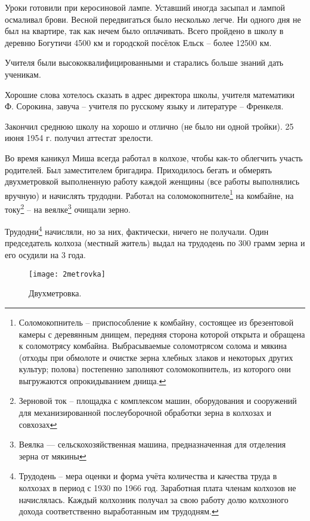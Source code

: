Уроки готовили при керосиновой лампе. Уставший иногда засыпал и лампой осмаливал брови. Весной передвигаться было несколько легче. Ни одного дня не был на квартире, так как нечем было оплачивать. Всего пройдено в школу в деревню Богутичи 4500 км и городской посёлок Ельск \--- более 12500 км. 

Учителя были высококвалифицированными и старались больше знаний дать ученикам.

Хорошие слова хотелось сказать в адрес директора школы, учителя математики Ф. Сорокина, завуча \--- учителя по русскому языку и литературе \--- Френкеля. 

Закончил среднюю школу на хорошо и отлично (не было ни одной тройки). 25 июня 1954 г. получил аттестат зрелости.

Во время каникул Миша всегда работал в колхозе, чтобы как-то облегчить участь родителей. Был заместителем бригадира. Приходилось бегать и обмерять двухметровкой выполненную работу каждой женщины (все работы выполнялись вручную) и начислять трудодни. Работал на соломокопнителе\footnote{Соломокопнитель \--- приспособление к комбайну, состоящее из брезентовой камеры с деревянным днищем, передняя сторона которой открыта и обращена к соломотрясу комбайна. Выбрасываемые соломотрясом солома и мякина (отходы при обмолоте и очистке зерна хлебных злаков и некоторых других культур; полова) постепенно заполняют соломокопнитель, из которого они выгружаются опрокидыванием днища.} на комбайне, на току\footnote{Зерновой ток \--- площадка с комплексом машин, оборудования и сооружений для механизированной послеуборочной обработки зерна в колхозах и совхозах} \--- на веялке\footnote{Веялка — сельскохозяйственная машина, предназначенная для отделения зерна от мякины} очищали зерно.

Трудодни\footnote{Трудодень \--- мера оценки и форма учёта количества и качества труда в колхозах в период с 1930 по 1966 год. Заработная плата членам колхозов не начислялась. Каждый колхозник получал за свою работу долю колхозного дохода соответственно выработанным им трудодням.} начисляли, но за них, фактически, ничего не получали. Один председатель колхоза (местный житель) выдал на трудодень по 300 грамм зерна и его осудили на 3 года.

\begin{wrapfigure}{O}{.2\textwidth}
\centering
\texttt{[image: 2metrovka]}
\caption[Двухметровка.]{Двухметровка\footnotemark.}
\label{fig:2metrovka}
\end{wrapfigure}

